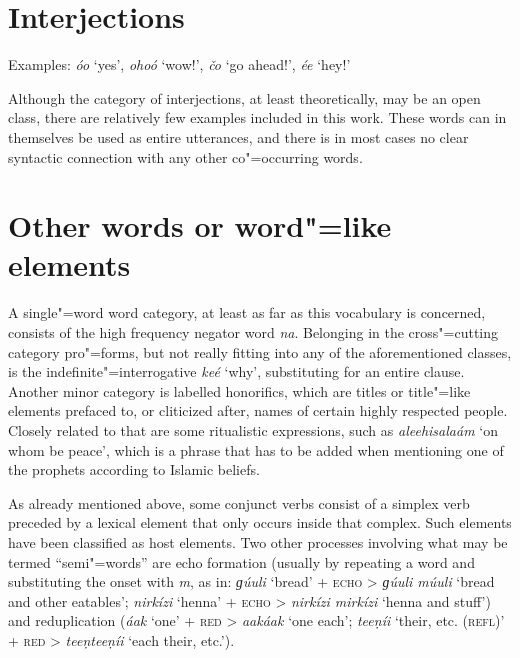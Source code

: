\section{Interjections}
\label{sec:3b-14}
Examples: \textit{óo} `yes', \textit{ohoó} `wow!', \textit{čo} `go ahead!', \textit{ée} `hey!'


Although the category of interjections, at least theoretically, may be an open class, there are relatively few examples included in this work. These words can in themselves be used as entire utterances, and there is in most cases no clear syntactic connection with any other co"=occurring words.


\section{Other words or word"=like elements}
\label{sec:3b-15}
A single"=word word category, at least as far as this vocabulary is concerned, consists of the high frequency negator word \textit{na}. Belonging in the cross"=cutting category pro"=forms, but not really fitting into any of the aforementioned classes, is the indefinite"=interrogative \textit{keé} `why', substituting for an entire clause. Another minor category is labelled honorifics, which are titles or title"=like elements prefaced to, or cliticized after, names of certain highly respected people. Closely related to that are some ritualistic expressions, such as \textit{aleehisalaám} `on whom be peace', which is a phrase that has to be added when mentioning one of the prophets according to Islamic beliefs.


As already mentioned above, some conjunct verbs consist of a simplex verb preceded by a lexical element that only occurs inside that complex. Such elements have been classified as host elements. Two other processes involving what may be termed ``semi"=words'' are echo formation (usually by repeating a word and substituting the onset with \textit{m}, as in: \textit{ɡúuli} `bread' + \textsc{echo} > \textit{ɡúuli múuli} `bread and other eatables'; \textit{nirkízi} `henna' + \textsc{echo} > \textit{nirkízi mirkízi} `henna and stuff') and reduplication (\textit{áak} `one' + \textsc{red} > \textit{aakáak} `one each'; \textit{teeṇíi} `their, etc. (\textsc{refl})' + \textsc{red} > \textit{teeṇteeṇíi} `each their, etc.').

